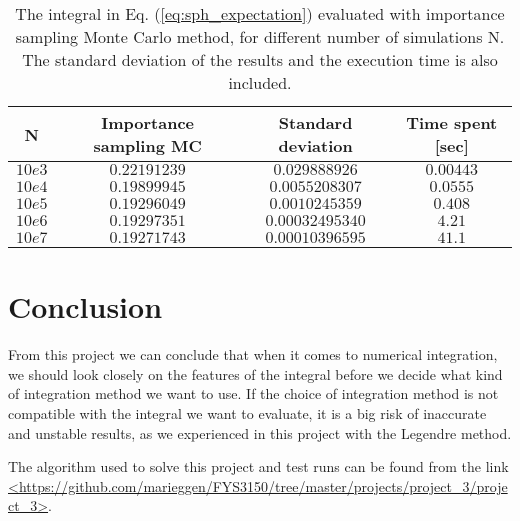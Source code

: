 \documentclass[12pt]{article}
\begin{document}
\begin{flushleft}
\begin{table}[!h]
\begin{center}
\begin{tabular}{| c | c | c | c |}
	\hline
	\textbf{N}  & \textbf{Importance sampling MC} &  \textbf{Standard deviation} & \textbf{Time spent [sec]}\\
	\hline		
	$10e3$ & $0.22191239$ & $0.029888926$ & $0.00443$ \\
    $10e4$ & $0.19899945$ & $0.0055208307$ & $0.0555$\\
    $10e5$ & $0.19296049$ & $0.0010245359$ & $0.408$\\
    $10e6$ & $0.19297351$ & $0.00032495340$ & $4.21$\\
    $10e7$ & $0.19271743$ & $0.00010396595$ & $41.1$\\
  \hline
\end{tabular}
\end{center}
\caption{\label{tab:isMC}The integral in Eq. (\ref{eq:sph_expectation}) evaluated with importance sampling Monte Carlo method, for different number of simulations N. The standard deviation of the results and the execution time is also included.}
\end{table}
\vspace{5mm}



\newpage
\section*{Conclusion}
From this project we can conclude that when it comes to numerical integration, we should look closely on the features of the integral before we decide what kind of integration method we want to use.  If the choice of integration method is not compatible with the integral we want to evaluate, it is a big risk of inaccurate and unstable results, as we experienced in this project with the Legendre method.  


\vspace{10mm}
The algorithm used to solve this project and test runs can be found from the link \url{<https://github.com/marieggen/FYS3150/tree/master/projects/project_3/project_3>}.









\end{flushleft}
\end{document}
